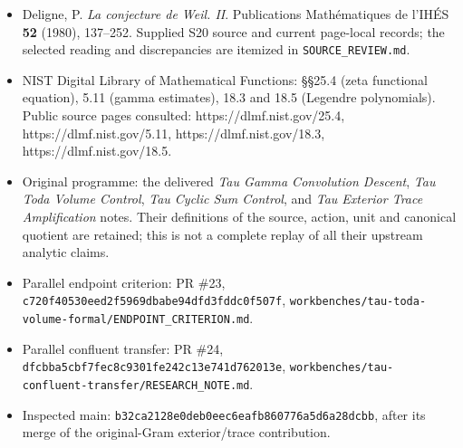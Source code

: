 \begin{itemize}
\tightlist
\item
  Deligne, P. \emph{La conjecture de Weil. II}. Publications
  Mathématiques de l'IHÉS \textbf{52} (1980), 137--252. Supplied S20
  source and current page-local records; the selected reading and
  discrepancies are itemized in \texttt{SOURCE\_REVIEW.md}.
\item
  NIST Digital Library of Mathematical Functions: §§25.4 (zeta
  functional equation), 5.11 (gamma estimates), 18.3 and 18.5 (Legendre
  polynomials). Public source pages consulted:
  https://dlmf.nist.gov/25.4, https://dlmf.nist.gov/5.11,
  https://dlmf.nist.gov/18.3, https://dlmf.nist.gov/18.5.
\item
  Original programme: the delivered \emph{Tau Gamma Convolution
  Descent}, \emph{Tau Toda Volume Control}, \emph{Tau Cyclic Sum
  Control}, and \emph{Tau Exterior Trace Amplification} notes. Their
  definitions of the source, action, unit and canonical quotient are
  retained; this is not a complete replay of all their upstream analytic
  claims.
\item
  Parallel endpoint criterion: PR \#23,
  \texttt{c720f405\allowbreak 30eed2f5\allowbreak 969dbabe\allowbreak 94dfd3fd\allowbreak dc0f507f},
  \texttt{workbenches/tau-toda-volume-formal/ENDPOINT\_CRITERION.md}.
\item
  Parallel confluent transfer: PR \#24,
  \texttt{dfcbba5c\allowbreak bf7fec8c\allowbreak 9301fe24\allowbreak 2c13e741\allowbreak d762013e},
  \texttt{workbenches/tau-confluent-transfer/RESEARCH\_NOTE.md}.
\item
  Inspected main: \texttt{b32ca212\allowbreak 8e0deb0e\allowbreak ec6eafb8\allowbreak 60776a5d\allowbreak 6a28dcbb},
  after its merge of the original-Gram exterior/trace contribution.
\end{itemize}

\endgroup
